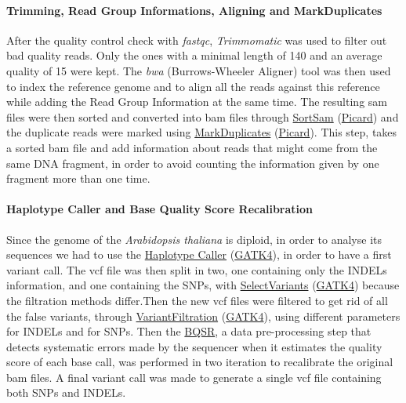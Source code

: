 \documentclass[10pt,a4paper]{article}
\begin{document}
\paragraph{Trimming, Read Group Informations, Aligning and MarkDuplicates} After the quality control check with \textit{fastqc}\cite{andrews2012}, \textit{Trimmomatic}\cite{bolger_trimmomatic:_2014} was used to filter out bad quality reads. Only the ones with a minimal length of 140 and an average quality of 15 were kept. The \textit{bwa} (Burrows-Wheeler Aligner) tool was then used to index the reference genome
and to align all the reads against this reference while adding the Read Group Information at the same time. The resulting sam files were then sorted and converted into bam files through  \href{https://software.broadinstitute.org/gatk/documentation/tooldocs/4.0.8.0/picard_sam_SortSam.php}{SortSam} (\href{https://broadinstitute.github.io/picard/}{Picard}) and the duplicate reads were marked using  \href{https://software.broadinstitute.org/gatk/documentation/tooldocs/4.0.4.0/picard_sam_markduplicates_MarkDuplicates.php}{MarkDuplicates} (\href{https://broadinstitute.github.io/picard/}{Picard}). This step, takes a sorted bam file and  add information about reads that might come from the same DNA fragment, in order to avoid counting the information given by one fragment more than one time. 

\paragraph{Haplotype Caller and Base Quality Score Recalibration} Since the genome of the \textit{Arabidopsis thaliana} is diploid, in order to analyse its sequences we had to use the \href{https://software.broadinstitute.org/gatk/documentation/tooldocs/3.8-0/org_broadinstitute_gatk_tools_walkers_haplotypecaller_HaplotypeCaller.php}{Haplotype Caller} (\href{https://software.broadinstitute.org/gatk/}{GATK4}), in order to have a first variant call. The vcf file was then split in two, one containing only the INDELs information, and one containing the SNPs, with  \href{https://software.broadinstitute.org/gatk/documentation/tooldocs/3.8-0/org_broadinstitute_gatk_tools_walkers_variantutils_SelectVariants.php}{SelectVariants} (\href{https://software.broadinstitute.org/gatk/}{GATK4}) because the filtration methods differ.Then the new vcf files were filtered to get rid of all the false variants, through  \href{https://software.broadinstitute.org/gatk/documentation/tooldocs/3.8-0/org_broadinstitute_gatk_tools_walkers_filters_VariantFiltration.php}{VariantFiltration} (\href{https://software.broadinstitute.org/gatk/}{GATK4}), using different parameters for INDELs and for SNPs. Then the \href{https://gatkforums.broadinstitute.org/gatk/discussion/44/base-quality-score-recalibration-bqsr}{BQSR}, a data pre-processing step that detects systematic errors made by the sequencer when it estimates the quality score of each base call, was performed in two iteration to recalibrate the original bam files. A final variant call was made to generate a single vcf file containing both SNPs and INDELs. 
\end{document}
